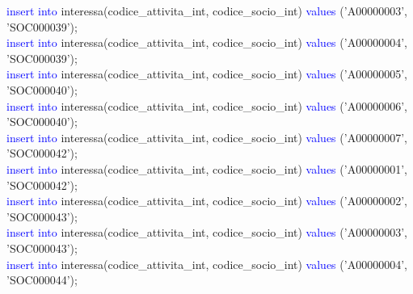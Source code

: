 \documentclass{article}
\begin{document}
\begin{flushleft}
{        \hspace*{0.5em}\textcolor{blue}{insert into} interessa(codice\_attivita\_int, codice\_socio\_int) \textcolor{blue}{values} \hspace*{0.5em}('A00000003', 'SOC000039'); \\
        \hspace*{0.5em}\textcolor{blue}{insert into} interessa(codice\_attivita\_int, codice\_socio\_int) \textcolor{blue}{values} \hspace*{0.5em}('A00000004', 'SOC000039'); \\
        \hspace*{0.5em}\textcolor{blue}{insert into} interessa(codice\_attivita\_int, codice\_socio\_int) \textcolor{blue}{values} \hspace*{0.5em}('A00000005', 'SOC000040'); \\
        \hspace*{0.5em}\textcolor{blue}{insert into} interessa(codice\_attivita\_int, codice\_socio\_int) \textcolor{blue}{values} \hspace*{0.5em}('A00000006', 'SOC000040'); \\
        \hspace*{0.5em}\textcolor{blue}{insert into} interessa(codice\_attivita\_int, codice\_socio\_int) \textcolor{blue}{values} \hspace*{0.5em}('A00000007', 'SOC000042'); \\
        \hspace*{0.5em}\textcolor{blue}{insert into} interessa(codice\_attivita\_int, codice\_socio\_int) \textcolor{blue}{values} \hspace*{0.5em}('A00000001', 'SOC000042'); \\
        \hspace*{0.5em}\textcolor{blue}{insert into} interessa(codice\_attivita\_int, codice\_socio\_int) \textcolor{blue}{values} \hspace*{0.5em}('A00000002', 'SOC000043'); \\
        \hspace*{0.5em}\textcolor{blue}{insert into} interessa(codice\_attivita\_int, codice\_socio\_int) \textcolor{blue}{values} \hspace*{0.5em}('A00000003', 'SOC000043'); \\
        \hspace*{0.5em}\textcolor{blue}{insert into} interessa(codice\_attivita\_int, codice\_socio\_int) \textcolor{blue}{values} \hspace*{0.5em}('A00000004', 'SOC000044'); \\
}
\end{flushleft}
\end{document}
